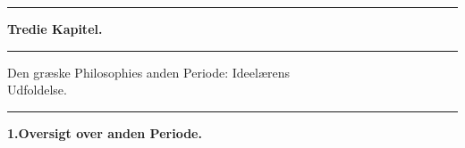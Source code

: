 \documentclass[12pt,a4paper]{book}
\newcommand{\divrule}{\begin{center}\rule{2cm}{0.4pt}\end{center}}
\begin{document}
\divrule
\begin{center}
{\Large\textbf{Tredie Kapitel.}}
\end{center}
\divrule
\begin{center}
{\Large Den græske Philosophies anden Periode: Ideelærens\\
Udfoldelse.}
\end{center}
\divrule
\begin{center}
\textbf{1.\enspace Oversigt over anden Periode.}
\end{center}
\end{document}
